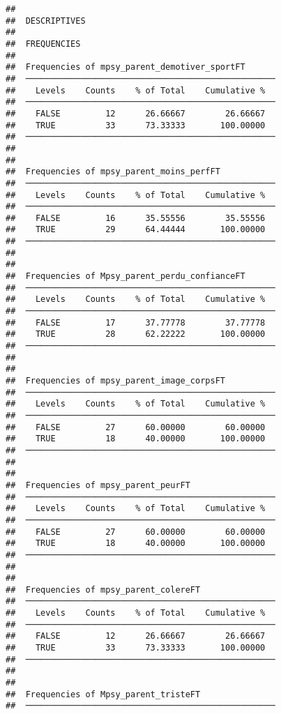 \documentclass[
]{article}
\begin{document}
\begin{verbatim}
## 
##  DESCRIPTIVES
## 
##  FREQUENCIES
## 
##  Frequencies of mpsy_parent_demotiver_sportFT       
##  ────────────────────────────────────────────────── 
##    Levels    Counts    % of Total    Cumulative %   
##  ────────────────────────────────────────────────── 
##    FALSE         12      26.66667        26.66667   
##    TRUE          33      73.33333       100.00000   
##  ────────────────────────────────────────────────── 
## 
## 
##  Frequencies of mpsy_parent_moins_perfFT            
##  ────────────────────────────────────────────────── 
##    Levels    Counts    % of Total    Cumulative %   
##  ────────────────────────────────────────────────── 
##    FALSE         16      35.55556        35.55556   
##    TRUE          29      64.44444       100.00000   
##  ────────────────────────────────────────────────── 
## 
## 
##  Frequencies of Mpsy_parent_perdu_confianceFT       
##  ────────────────────────────────────────────────── 
##    Levels    Counts    % of Total    Cumulative %   
##  ────────────────────────────────────────────────── 
##    FALSE         17      37.77778        37.77778   
##    TRUE          28      62.22222       100.00000   
##  ────────────────────────────────────────────────── 
## 
## 
##  Frequencies of mpsy_parent_image_corpsFT           
##  ────────────────────────────────────────────────── 
##    Levels    Counts    % of Total    Cumulative %   
##  ────────────────────────────────────────────────── 
##    FALSE         27      60.00000        60.00000   
##    TRUE          18      40.00000       100.00000   
##  ────────────────────────────────────────────────── 
## 
## 
##  Frequencies of mpsy_parent_peurFT                  
##  ────────────────────────────────────────────────── 
##    Levels    Counts    % of Total    Cumulative %   
##  ────────────────────────────────────────────────── 
##    FALSE         27      60.00000        60.00000   
##    TRUE          18      40.00000       100.00000   
##  ────────────────────────────────────────────────── 
## 
## 
##  Frequencies of mpsy_parent_colereFT                
##  ────────────────────────────────────────────────── 
##    Levels    Counts    % of Total    Cumulative %   
##  ────────────────────────────────────────────────── 
##    FALSE         12      26.66667        26.66667   
##    TRUE          33      73.33333       100.00000   
##  ────────────────────────────────────────────────── 
## 
## 
##  Frequencies of Mpsy_parent_tristeFT                
##  ────────────────────────────────────────────────── 

\end{verbatim}
\end{document}
